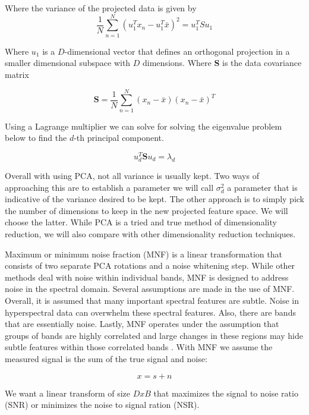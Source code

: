 \documentclass[conference,onecolumn]{IEEEtran}
\begin{document}
Where the variance of the projected data is given by
\begin{equation}
\frac{1}{N}\sum_{n=1}^N({u_{1}^{T}x_{n}-u_{1}^{T}\bar{x}})^{2} = u_{1}^{T}Su_{1}
\end{equation}

Where $u_{1}$ is a $D$-dimensional vector that defines an orthogonal projection in a smaller dimensional subspace with $D$ dimensions. Where \textbf{S} is the data covariance matrix

\begin{equation}
\mathbf{S}=\frac{1}{N}\sum_{n=1}^N(x_{n}-\bar{x})(x_{n}-\bar{x})^{T}
\end{equation} 

Using a Lagrange multiplier we can solve for solving the eigenvalue problem below to find the $d$-th principal component.

\begin{equation}
u_{d}^{T}\mathbf{S}u_{d}=\lambda_{d}
\end{equation}

Overall with using PCA, not all variance is usually kept. Two ways of approaching this are to establish a parameter we will call $\sigma_{d}^{2}$ a parameter that is indicative of the variance desired to be kept. The other approach is to simply pick the number of dimensions to keep in the new projected feature space. We will choose the latter. While PCA is a tried and true method of dimensionality reduction, we will also compare with other dimensionality reduction techniques.

Maximum or minimum noise fraction (MNF) is a linear transformation that consists of two separate PCA rotations and a noise whitening step. While other methods deal with noise within individual bands, MNF is designed to address noise in the spectral domain. Several assumptions are made in the use of MNF. Overall, it is assumed that many important spectral features are subtle. Noise in hyperspectral data can overwhelm these spectral features. Also, there are bands that are essentially noise. Lastly, MNF operates under the assumption that groups of bands are highly correlated and large changes in these regions may hide subtle features within those correlated bands \cite{Green}. With MNF we assume the measured signal is the sum of the true signal and noise:

\begin{equation}
x = s+n
\end{equation}

We want a linear transform of size $DxB$ that maximizes the signal to noise ratio (SNR) or minimizes the noise to signal ration (NSR).
\end{document}
